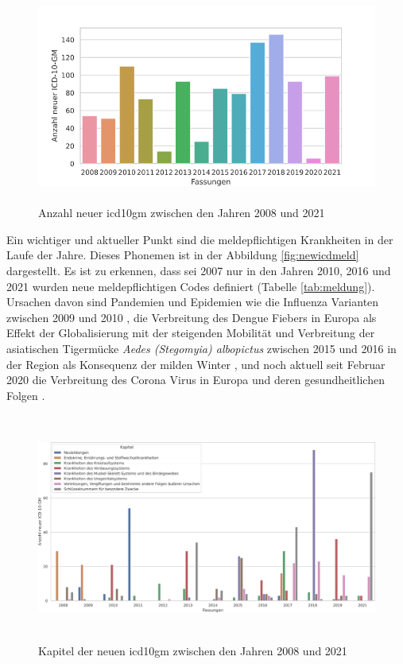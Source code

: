 \clearpage

\begin{figure}[ht]
	\centering
	\includegraphics[height=7cm]{figures/newicdyear}
	\caption[Neue \acs{icd10gm} pro Jahr]{Anzahl neuer \acs{icd10gm} zwischen den Jahren 2008 und 2021}
	\label{fig:newicdyear}
\end{figure} 

Ein wichtiger und aktueller Punkt sind die meldepflichtigen Krankheiten in der Laufe der Jahre. Dieses Phonemen ist in der Abbildung \ref{fig:newicdmeld} dargestellt. Es ist zu erkennen, dass sei 2007 nur in den Jahren 2010, 2016 und 2021 wurden neue meldepflichtigen Codes definiert (Tabelle \ref{tab:meldung}). Ursachen davon sind Pandemien und Epidemien wie die Influenza Varianten zwischen 2009 und 2010 \cite{influenza1, influenza2}, die Verbreitung des Dengue Fiebers in Europa als Effekt der Globalisierung mit der steigenden Mobilität \cite{denge1} und Verbreitung der asiatischen Tigermücke \textsl{Aedes (Stegomyia) albopictus} zwischen 2015 und 2016 in der Region als Konsequenz der milden Winter \cite{denge2}, und noch aktuell seit Februar 2020 die Verbreitung des Corona Virus in Europa \cite{corona1} und deren gesundheitlichen Folgen \cite{corona2}.

\clearpage

\begin{figure}[ht]
	\centering
	\includegraphics[height=7.5cm]{figures/kaptnrYear}
	\caption[Kapitel der \acs{icd10gm} pro Jahr]{Kapitel der neuen \acs{icd10gm} zwischen den Jahren 2008 und 2021}
	\label{fig:newicdcap}
\end{figure} 



